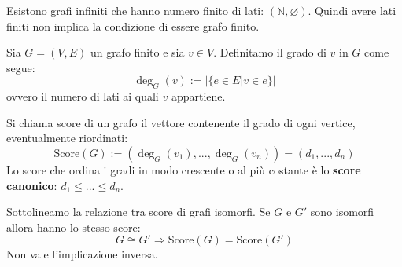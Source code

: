\documentclass[oneside]{book}
\begin{document}
\begin{osservaz}
Esistono grafi infiniti che hanno numero finito di
lati: $(\mathbb{N}, \varnothing)$. Quindi avere lati finiti non implica la
condizione di essere grafo finito.
\end{osservaz}

\begin{tcolorbox}[colback=yellow!30, colframe=yellow!30!black, title=Grado di un vertice]
Sia $G=(V,E)$ un grafo finito e sia $v \in V$. Definitamo il grado di $v$
in $G$ come segue:
\[  \deg_G(v) := |\{e \in E| v \in e\}| \]
ovvero il numero di lati ai quali $v$ appartiene.
\end{tcolorbox}

\begin{tcolorbox}[colback=yellow!30, colframe=yellow!30!black, title=Score di un grafo]
Si chiama score di un grafo il vettore contenente il grado di ogni vertice,
eventualmente riordinati:
\[ \text{Score}(G) := (\deg_G(v_1),...,\deg_G(v_n)) = (d_1,...,d_n) \]
Lo score che ordina i gradi in modo crescente o al più costante è lo \textbf{score canonico}:
$d_1\leq ...\leq d_n$.
\end{tcolorbox}
Sottolineamo la relazione tra score di grafi isomorfi. Se $G$ e $G'$ sono isomorfi allora hanno lo stesso score:
\[ G \cong G' \Longrightarrow \text{Score}(G) = \text{Score}(G') \]
Non vale l'implicazione inversa.
\end{document}
